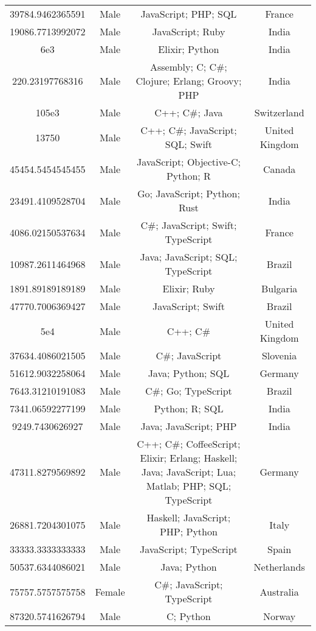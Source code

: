 \begin{center}
\begin{tabular}{ |c|c|c|c| }
39784.9462365591  &  Male  &  JavaScript; PHP; SQL  &  France  \\ 
19086.7713992072  &  Male  &  JavaScript; Ruby  &  India  \\ 
6e3  &  Male  &  Elixir; Python  &  India  \\ 
220.23197768316  &  Male  &  Assembly; C; C\#; Clojure; Erlang; Groovy; PHP  &  India  \\ 
105e3  &  Male  &  C++; C\#; Java  &  Switzerland  \\ 
13750  &  Male  &  C++; C\#; JavaScript; SQL; Swift  &  United Kingdom  \\ 
45454.5454545455  &  Male  &  JavaScript; Objective-C; Python; R  &  Canada  \\ 
23491.4109528704  &  Male  &  Go; JavaScript; Python; Rust  &  India  \\ 
4086.02150537634  &  Male  &  C\#; JavaScript; Swift; TypeScript  &  France  \\ 
10987.2611464968  &  Male  &  Java; JavaScript; SQL; TypeScript  &  Brazil  \\ 
1891.89189189189  &  Male  &  Elixir; Ruby  &  Bulgaria  \\ 
47770.7006369427  &  Male  &  JavaScript; Swift  &  Brazil  \\ 
5e4  &  Male  &  C++; C\#  &  United Kingdom  \\ 
37634.4086021505  &  Male  &  C\#; JavaScript  &  Slovenia  \\ 
51612.9032258064  &  Male  &  Java; Python; SQL  &  Germany  \\ 
7643.31210191083  &  Male  &  C\#; Go; TypeScript  &  Brazil  \\ 
7341.06592277199  &  Male  &  Python; R; SQL  &  India  \\ 
9249.7430626927  &  Male  &  Java; JavaScript; PHP  &  India  \\ 
47311.8279569892  &  Male  &  C++; C\#; CoffeeScript; Elixir; Erlang; Haskell; Java; JavaScript; Lua; Matlab; PHP; SQL; TypeScript  &  Germany  \\ 
26881.7204301075  &  Male  &  Haskell; JavaScript; PHP; Python  &  Italy  \\ 
33333.3333333333  &  Male  &  JavaScript; TypeScript  &  Spain  \\ 
50537.6344086021  &  Male  &  Java; Python  &  Netherlands  \\ 
75757.5757575758  &  Female  &  C\#; JavaScript; TypeScript  &  Australia  \\ 
87320.5741626794  &  Male  &  C; Python  &  Norway  \\ 

\end{tabular}
\end{center}
